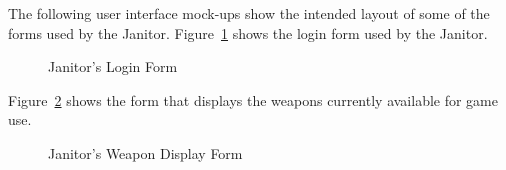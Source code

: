 The following user interface mock-ups show the intended layout of some of the forms used by the Janitor. Figure~\ref{fig:janitor-login} shows the login form used by the Janitor.

\begin{figure}[htbp]
  \centering
  \caption{Janitor's Login Form}
  \label{fig:janitor-login}
\end{figure}

Figure~\ref{fig:janitor-weapon-display} shows the form that displays the weapons currently available for game use.

\begin{figure}[htbp]
  \centering
  \caption{Janitor's Weapon Display Form}
  \label{fig:janitor-weapon-display}
\end{figure}


